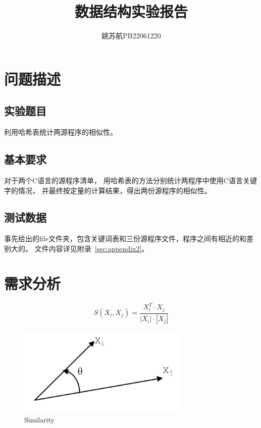 \documentclass[a4paper]{article}
\title{\textbf{数据结构实验报告}}
\author{姚苏航\qquad PB22061220}
\date{}
\begin{document}
	\maketitle


	\section{问题描述}\label{sec:des}

	\subsection{实验题目}\label{subsec:q}
	{{利用哈希表统计两源程序的相似性。}}

	\subsection{基本要求}\label{subsec:req}
	{{对于两个C语言的源程序清单，
	用哈希表的方法分别统计两程序中使用C语言关键字的情况，
	并最终按定量的计算结果，得出两份源程序的相似性。}}

	\subsection{测试数据}\label{subsec:test}
	{{事先给出的file文件夹，包含关键词表和三份源程序文件，程序之间有相近的和差别大的。
	文件内容详见附录~\ref{sec:appendix2}。}}


	\section{需求分析}\label{sec:need}


	\begin{equation}
		S(X_i,X_j)=\frac{X_i^T\cdot X_j}{|X_i|\cdot|X_j|}\label{eq:equation}
	\end{equation}
	\begin{figure}[htbp]
		\centering
		\includegraphics[height=120pt]{S}
		\caption{Similarity}
	\end{figure}
\end{document}
